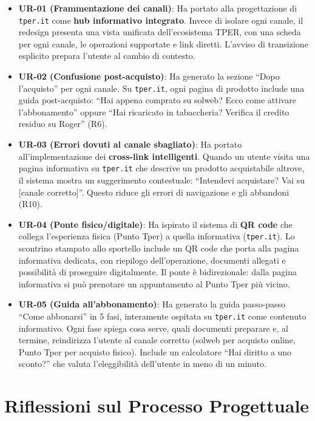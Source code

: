 \documentclass[11pt,a4paper]{article}
\begin{document}
\begin{itemize}
    \item \textbf{UR-01 (Frammentazione dei canali)}: Ha portato alla progettazione di \texttt{tper.it} come \textbf{hub informativo integrato}. Invece di isolare ogni canale, il redesign presenta una vista unificata dell'ecosistema TPER, con una scheda per ogni canale, le operazioni supportate e link diretti. L'avviso di transizione esplicito prepara l'utente al cambio di contesto.
    \item \textbf{UR-02 (Confusione post-acquisto)}: Ha generato la sezione ``Dopo l'acquisto'' per ogni canale. Su \texttt{tper.it}, ogni pagina di prodotto include una guida post-acquisto: ``Hai appena comprato su solweb? Ecco come attivare l'abbonamento'' oppure ``Hai ricaricato in tabaccheria? Verifica il credito residuo su Roger'' (R6).
    \item \textbf{UR-03 (Errori dovuti al canale sbagliato)}: Ha portato all'implementazione dei \textbf{cross-link intelligenti}. Quando un utente visita una pagina informativa su \texttt{tper.it} che descrive un prodotto acquistabile altrove, il sistema mostra un suggerimento contestuale: ``Intendevi acquistare? Vai su [canale corretto]''. Questo riduce gli errori di navigazione e gli abbandoni (R10).
    \item \textbf{UR-04 (Ponte fisico/digitale)}: Ha ispirato il sistema di \textbf{QR code} che collega l'esperienza fisica (Punto Tper) a quella informativa (\texttt{tper.it}). Lo scontrino stampato allo sportello include un QR code che porta alla pagina informativa dedicata, con riepilogo dell'operazione, documenti allegati e possibilit\`a di proseguire digitalmente. Il ponte \`e bidirezionale: dalla pagina informativa si pu\`o prenotare un appuntamento al Punto Tper pi\`u vicino.
    \item \textbf{UR-05 (Guida all'abbonamento)}: Ha generato la guida passo-passo ``Come abbonarsi'' in 5 fasi, interamente ospitata su \texttt{tper.it} come contenuto informativo. Ogni fase spiega cosa serve, quali documenti preparare e, al termine, reindirizza l'utente al canale corretto (solweb per acquisto online, Punto Tper per acquisto fisico). Include un calcolatore ``Hai diritto a uno sconto?'' che valuta l'eleggibilit\`a dell'utente in meno di un minuto.
\end{itemize}

\vspace{0.3cm}

\section{Riflessioni sul Processo Progettuale}
\end{document}
